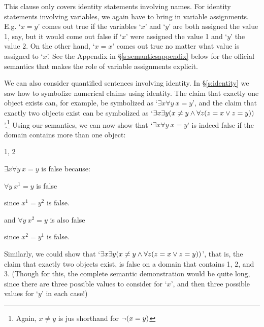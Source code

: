 This clause only covers identity statements involving names.  For identity statements involving variables, we again have to bring in variable assignments.  E.g. `$x=y$' comes out true if the variables `$x$' and `$y$' are both assigned the value 1, say, but it would come out false if `$x$' were assigned the value 1 and `$y$' the value $2$.  On the other hand, `$x=x$' comes out true no matter what value is assigned to `$x$'.  See the Appendix in \S\ref{s:semanticsappendix} below for the official semantics that makes the role of variable assignments explicit.


We can also consider quantified sentences involving identity.  In \S\ref{s:identity} we saw how to symbolize numerical claims using identity.  The claim that exactly one object exists can, for example, be symbolized as `$\exists x \forall y \ x = y$', and the claim that exactly two objects exist can be symbolized as `$\exists x \exists y( x \neq y \wedge \forall z(z = x \vee z = y))$'.\footnote{Again, $x \neq y$ is jus shorthand for $\neg (x = y)$}   Using our semantics, we can now show that `$\exists x \forall y \ x = y$' is indeed false if the domain contains more than one object:

\begin{center}

\begin{ekey}
	\item[\text{Domain}] 1, 2
\end{ekey}
\end{center}

\begin{ebullet}
\item[] $\exists x \forall y \ x = y$ is false because:
\begin{etriangle}
\item $\forall y \ x^1 = y$ is false
\begin{etriangle}
\item since $x^1 = y^2$ is false.
\end{etriangle}
\item and $\forall y \ x^2 = y$ is also false
\begin{etriangle}
\item since $x^2 = y^1$ is false.
\end{etriangle}
\end{etriangle}
\end{ebullet}
Similarly, we could show that `$\exists x \exists y( x \neq y \wedge \forall z(z = x \vee z = y))$', that is, the claim that exactly two objects exist, is false on a domain that contains 1, 2, and 3. (Though for this, the complete semantic demonstration would be quite long, since there are three possible values to consider for `$x$', and then three possible values for `$y$' in each case!)


